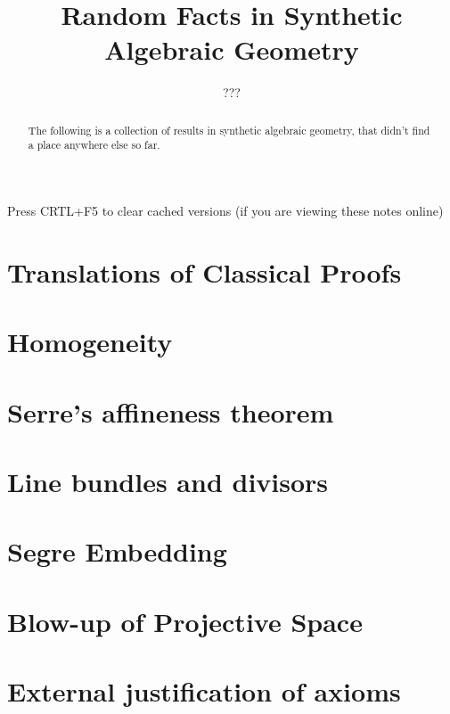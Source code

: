 \documentclass{../util/zariski}
\title{Random Facts in Synthetic Algebraic Geometry}
\author{???}
\begin{document}
\maketitle

\begin{center}
  \color{purple}
  \large{Press CRTL+F5 to clear cached versions}
  \large{(if you are viewing these notes online)}
\end{center}

\begin{abstract}
  The following is a collection of results in synthetic algebraic geometry,
  that didn't find a place anywhere else so far.
\end{abstract}

\tableofcontents

\section{Translations of Classical Proofs}


\section{Homogeneity}


\section{Serre's affineness theorem}


\section{Line bundles and divisors}


\section{Segre Embedding}


\section{Blow-up of Projective Space}


\section{External justification of axioms}

\end{document}
